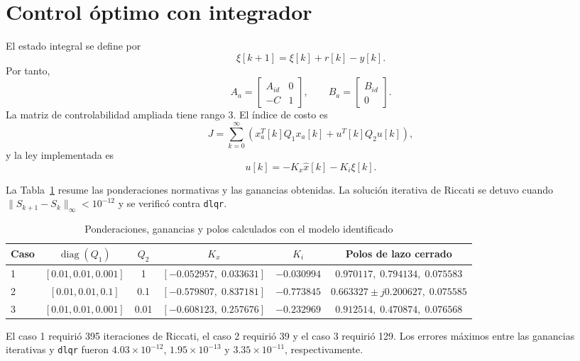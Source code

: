 \documentclass[conference]{IEEEtran}
\begin{document}
\section{Control óptimo con integrador}
El estado integral se define por
\begin{equation}
\xi[k+1]=\xi[k]+r[k]-y[k].
\end{equation}
Por tanto,
\begin{equation}
A_a=\begin{bmatrix}A_{id}&0\\-C&1\end{bmatrix},\qquad
B_a=\begin{bmatrix}B_{id}\\0\end{bmatrix}.
\end{equation}
La matriz de controlabilidad ampliada tiene rango 3. El índice de costo es
\begin{equation}
J=\sum_{k=0}^{\infty}\left(x_a^T[k]Q_1x_a[k]+u^T[k]Q_2u[k]\right),
\end{equation}
y la ley implementada es
\begin{equation}
u[k]=-K_x\hat{x}[k]-K_i\xi[k].
\end{equation}

La Tabla~\ref{tab:ganancias} resume las ponderaciones normativas y las ganancias obtenidas. La solución iterativa de Riccati se detuvo cuando $\|S_{k+1}-S_k\|_{\infty}<10^{-12}$ y se verificó contra \texttt{dlqr}.

\begin{table}[!t]
\caption{Ponderaciones, ganancias y polos calculados con el modelo identificado}
\label{tab:ganancias}
\centering
\small
\begin{tabular}{lccccc}
\toprule
Caso & $\operatorname{diag}(Q_1)$ & $Q_2$ & $K_x$ & $K_i$ & Polos de lazo cerrado\\
\midrule
1 & $[0.01,0.01,0.001]$ & 1 & $[-0.052957,\;0.033631]$ & $-0.030994$ & $0.970117,\;0.794134,\;0.075583$\\
2 & $[0.01,0.01,0.1]$ & 0.1 & $[-0.579807,\;0.837181]$ & $-0.773845$ & $0.663327\pm j0.200627,\;0.075585$\\
3 & $[0.01,0.01,0.001]$ & 0.01 & $[-0.608123,\;0.257676]$ & $-0.232969$ & $0.912514,\;0.470874,\;0.076568$\\
\bottomrule
\end{tabular}
\end{table}

El caso 1 requirió 395 iteraciones de Riccati, el caso 2 requirió 39 y el caso 3 requirió 129. Los errores máximos entre las ganancias iterativas y \texttt{dlqr} fueron $4.03\times10^{-12}$, $1.95\times10^{-13}$ y $3.35\times10^{-11}$, respectivamente.
\end{document}
